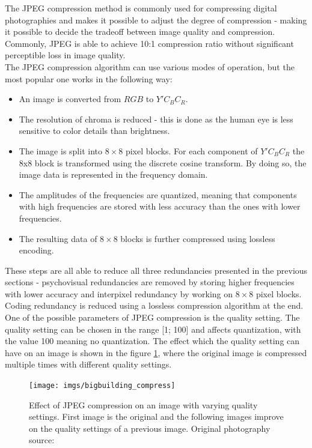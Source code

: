 \documentclass[thesis=M,english]{FITthesis}[2012/10/20]
\begin{document}
The JPEG compression method is commonly used for compressing digital
photographies and makes it possible to adjust the degree of compression
- making it possible to decide the tradeoff between image quality and
compression. Commonly, JPEG is able to achieve 10:1 compression ratio
without significant perceptible loss in image quality.\cite{nasajpeg}
\\

The JPEG compression algorithm can use various modes of operation, but
the most popular one works in the following way:
\begin{itemize}
    \item An image is converted from $RGB$ to $Y'C_BC_R$.
    \item The resolution of chroma is reduced - this is done as the human eye is less
    sensitive to color details than brightness.
    \item The image is split into $8 \times 8$ pixel blocks. For each component of $Y'C_BC_R$
    the 8x8 block is transformed using the discrete cosine transform. By doing so,
    the image data is represented in the frequency domain.
    \item The amplitudes of the frequencies are quantized, meaning that components
    with high frequencies are stored with less accuracy than the ones with lower
    frequencies.
    \item The resulting data of $8 \times 8$ blocks is further compressed using lossless
    encoding.
\end{itemize}
These steps are all able to reduce all three redundancies presented in the previous
sections - psychovisual redundancies are removed by storing higher frequencies with
lower accuracy and interpixel redundancy by working on $8 \times 8$ pixel blocks. Coding
redundancy is reduced using a lossless compression algorithm at the end.
\\

One of the possible parameters of JPEG compression is the quality setting. The quality
setting can be chosen in the range [1; 100] and affects quantization, with the value
100 meaning no quantization. The effect which the quality setting can have on an
image is shown in the figure \ref{fig:jpegquality}, where the original image is compressed
multiple times with different quality settings.

\begin{figure}[h]
  \centering
  \texttt{[image: imgs/bigbuilding\_compress]}
  \caption{Effect of JPEG compression on an image with varying quality settings.
           First image is the original and the following images improve on the
           quality settings of a previous image. Original photography source: \cite{imgcomprbenchmark}}
  \label{fig:jpegquality}
\end{figure}
\end{document}
